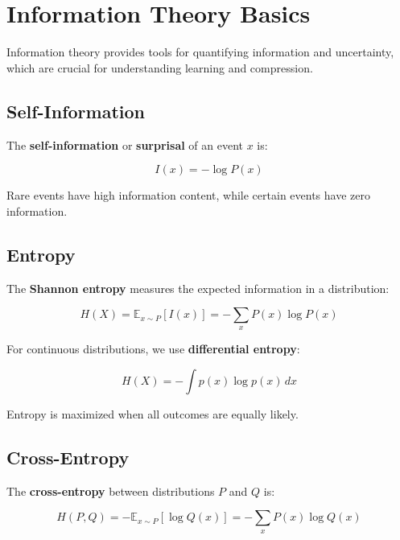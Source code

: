 
\section{Information Theory Basics}
\label{sec:information-theory}

Information theory provides tools for quantifying information and uncertainty, which are crucial for understanding learning and compression.

\subsection{Self-Information}

The \textbf{self-information} or \textbf{surprisal} of an event $x$ is:

\begin{equation}
I(x) = -\log P(x)
\end{equation}

Rare events have high information content, while certain events have zero information.

\subsection{Entropy}

The \textbf{Shannon entropy} measures the expected information in a distribution:

\begin{equation}
H(X) = \mathbb{E}_{x \sim P}[I(x)] = -\sum_{x} P(x) \log P(x)
\end{equation}

For continuous distributions, we use \textbf{differential entropy}:

\begin{equation}
H(X) = -\int p(x) \log p(x) \, dx
\end{equation}

Entropy is maximized when all outcomes are equally likely.

\subsection{Cross-Entropy}

The \textbf{cross-entropy} between distributions $P$ and $Q$ is:

\begin{equation}
H(P, Q) = -\mathbb{E}_{x \sim P}[\log Q(x)] = -\sum_{x} P(x) \log Q(x)
\end{equation}

